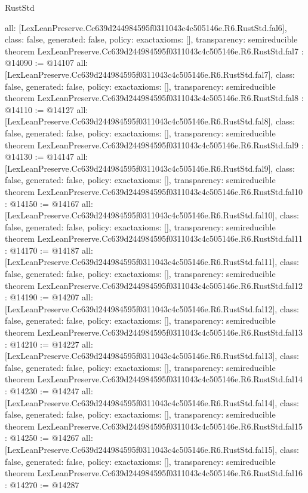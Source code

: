 \begin{lexlean}{RustStd}
\begin{coremodule}
{  all: [LexLeanPreserve.Cc639d244984595f0311043c4c505146e.R6.RustStd.fal6],
  class: false,
  generated: false,
  policy: exact{axioms: []},
  transparency: semireducible
}
theorem LexLeanPreserve.Cc639d244984595f0311043c4c505146e.R6.RustStd.fal7 : @14090 := @14107 {
  all: [LexLeanPreserve.Cc639d244984595f0311043c4c505146e.R6.RustStd.fal7],
  class: false,
  generated: false,
  policy: exact{axioms: []},
  transparency: semireducible
}
theorem LexLeanPreserve.Cc639d244984595f0311043c4c505146e.R6.RustStd.fal8 : @14110 := @14127 {
  all: [LexLeanPreserve.Cc639d244984595f0311043c4c505146e.R6.RustStd.fal8],
  class: false,
  generated: false,
  policy: exact{axioms: []},
  transparency: semireducible
}
theorem LexLeanPreserve.Cc639d244984595f0311043c4c505146e.R6.RustStd.fal9 : @14130 := @14147 {
  all: [LexLeanPreserve.Cc639d244984595f0311043c4c505146e.R6.RustStd.fal9],
  class: false,
  generated: false,
  policy: exact{axioms: []},
  transparency: semireducible
}
theorem LexLeanPreserve.Cc639d244984595f0311043c4c505146e.R6.RustStd.fal10 : @14150 := @14167 {
  all: [LexLeanPreserve.Cc639d244984595f0311043c4c505146e.R6.RustStd.fal10],
  class: false,
  generated: false,
  policy: exact{axioms: []},
  transparency: semireducible
}
theorem LexLeanPreserve.Cc639d244984595f0311043c4c505146e.R6.RustStd.fal11 : @14170 := @14187 {
  all: [LexLeanPreserve.Cc639d244984595f0311043c4c505146e.R6.RustStd.fal11],
  class: false,
  generated: false,
  policy: exact{axioms: []},
  transparency: semireducible
}
theorem LexLeanPreserve.Cc639d244984595f0311043c4c505146e.R6.RustStd.fal12 : @14190 := @14207 {
  all: [LexLeanPreserve.Cc639d244984595f0311043c4c505146e.R6.RustStd.fal12],
  class: false,
  generated: false,
  policy: exact{axioms: []},
  transparency: semireducible
}
theorem LexLeanPreserve.Cc639d244984595f0311043c4c505146e.R6.RustStd.fal13 : @14210 := @14227 {
  all: [LexLeanPreserve.Cc639d244984595f0311043c4c505146e.R6.RustStd.fal13],
  class: false,
  generated: false,
  policy: exact{axioms: []},
  transparency: semireducible
}
theorem LexLeanPreserve.Cc639d244984595f0311043c4c505146e.R6.RustStd.fal14 : @14230 := @14247 {
  all: [LexLeanPreserve.Cc639d244984595f0311043c4c505146e.R6.RustStd.fal14],
  class: false,
  generated: false,
  policy: exact{axioms: []},
  transparency: semireducible
}
theorem LexLeanPreserve.Cc639d244984595f0311043c4c505146e.R6.RustStd.fal15 : @14250 := @14267 {
  all: [LexLeanPreserve.Cc639d244984595f0311043c4c505146e.R6.RustStd.fal15],
  class: false,
  generated: false,
  policy: exact{axioms: []},
  transparency: semireducible
}
theorem LexLeanPreserve.Cc639d244984595f0311043c4c505146e.R6.RustStd.fal16 : @14270 := @14287 {
}
\end{coremodule}
\end{lexlean}
